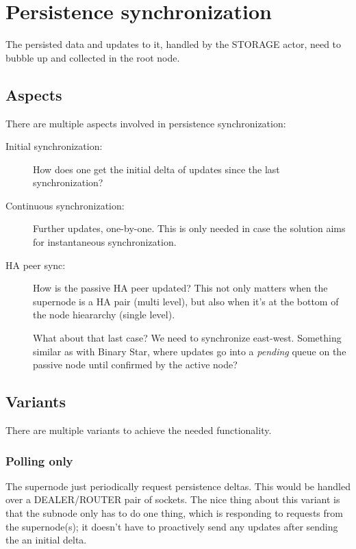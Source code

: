 \section{Persistence synchronization}\label{sec:approach:psync}
The persisted data and updates to it, handled by the STORAGE actor, need to
bubble up and collected in the root node.

\subsection{Aspects}
There are multiple aspects involved in persistence synchronization:

\begin{description}
	\item [Initial synchronization:]
		How does one get the initial delta of updates since the last
		synchronization?

	\item [Continuous synchronization:]
		Further updates, one-by-one. This is only needed in
		case the solution aims for instantaneous synchronization.

	\item [HA peer sync:]
		How is the passive HA peer updated?
		This not only matters when the supernode is a HA pair (multi
		level), but also when it's at the bottom of the node hieararchy
		(single level).

		\large\color{red} What about that last case? We need to synchronize
		east-west. Something similar as with Binary Star, where updates
		go into a \emph{pending} queue on the passive node until
		confirmed by the active node?
\end{description}

\subsection{Variants}
There are multiple variants to achieve the needed functionality.

\subsubsection{Polling only}
The supernode just periodically request persistence
deltas. This would be handled over a DEALER/ROUTER pair of sockets. The nice
thing about this variant is that the subnode only has to do one thing, which is
responding to requests from the supernode(s); it doesn't have to proactively
send any updates after sending the an initial delta.

